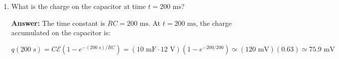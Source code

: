 \documentclass{article}
\begin{document}
\begin{enumerate}
  \item What is the charge on the capacitor at time $t = 200\text{ ms}$?

        \ifsolutions
        {\bf Answer: } The time constant is $RC=200\text{ ms}$. At $t=200\text{ ms}$, the charge accumulated on the capacitor is:

        \begin{equation}
        q(200\text{ s}) = C\mathcal{E}(1-e^{-(200\text{ s})/RC}) = (10\text{ mF} \cdot 12\text{ V})(1-e^{-200/200})\simeq (120\text{ mV})(0.63)\simeq 75.9\text{ mV}
        \end{equation}
        \else

        \fi
        \ifsolutions\else

        \fi

\end{enumerate}
\end{document}

